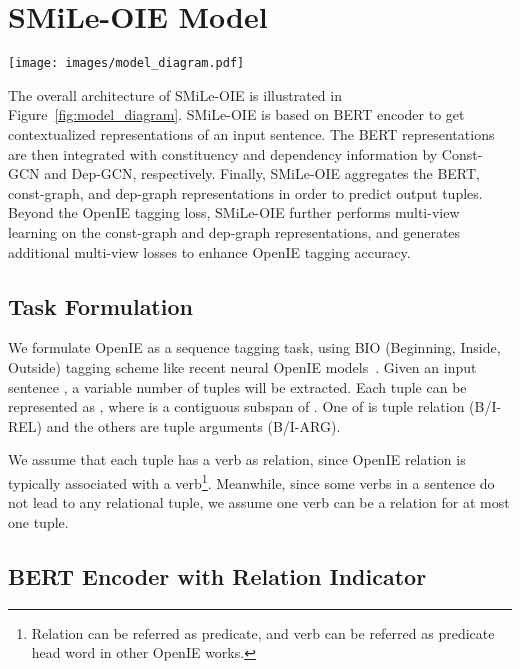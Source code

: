 \documentclass[11pt]{article}
\newcommand{\mname}{SMiLe-OIE\xspace}
\begin{document}
\section{\mname Model}\label{sec:model}
\setlength{\abovedisplayskip}{3pt}
\setlength{\belowdisplayskip}{3pt}

\begin{figure*}
   \centering
   \texttt{[image: images/model\_diagram.pdf]}
\caption{Overview of \mname model architecture.}
   \label{fig:model_diagram}
\end{figure*}


The overall architecture of \mname is illustrated in Figure~\ref{fig:model_diagram}. \mname is based on BERT encoder to get contextualized representations of an input sentence. The BERT representations are then integrated with constituency and dependency information by Const-GCN and Dep-GCN, respectively. Finally, \mname aggregates the BERT, const-graph, and dep-graph representations in order to predict output tuples. Beyond the OpenIE tagging loss, \mname  further performs multi-view learning on the const-graph and dep-graph representations, and generates additional multi-view losses to enhance OpenIE tagging accuracy.


\subsection{Task Formulation}


We formulate OpenIE as a sequence tagging task, using BIO (Beginning, Inside, Outside) tagging scheme like recent neural OpenIE models~\cite{stanovsky2018supervised}.
Given an input sentence , a variable number of tuples will be extracted. Each tuple can be represented as , where  is a contiguous subspan of .
One of  is tuple relation (B/I-REL) and the others are tuple arguments (B/I-ARG).

We assume that each tuple has a verb as relation, since OpenIE relation is typically associated with a verb\footnote{Relation can be referred as predicate, and verb can be referred as predicate head word in other OpenIE works.}. Meanwhile, since some verbs in a sentence do not lead to any relational tuple, we assume one verb can be a relation for at most one tuple.



\subsection{BERT Encoder with Relation Indicator}\label{subsec:bert_encoder}
\end{document}
